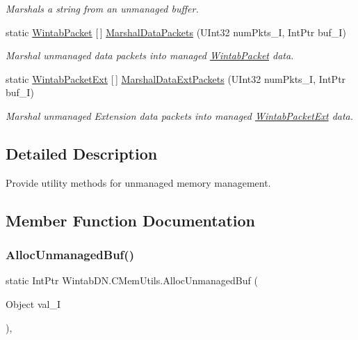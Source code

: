 \begin{DoxyCompactItemize}
\begin{DoxyCompactList}\small\item\em Marshals a string from an unmanaged buffer. \end{DoxyCompactList}\item 
static \mbox{\hyperlink{struct_wintab_d_n_1_1_wintab_packet}{Wintab\+Packet}} \mbox{[}$\,$\mbox{]} \mbox{\hyperlink{class_wintab_d_n_1_1_c_mem_utils_aca1dfda3c26d87d8ab83fa2a2c880c6a}{Marshal\+Data\+Packets}} (U\+Int32 num\+Pkts\+\_\+I, Int\+Ptr buf\+\_\+I)
\begin{DoxyCompactList}\small\item\em Marshal unmanaged data packets into managed \mbox{\hyperlink{struct_wintab_d_n_1_1_wintab_packet}{Wintab\+Packet}} data. \end{DoxyCompactList}\item 
static \mbox{\hyperlink{struct_wintab_d_n_1_1_wintab_packet_ext}{Wintab\+Packet\+Ext}} \mbox{[}$\,$\mbox{]} \mbox{\hyperlink{class_wintab_d_n_1_1_c_mem_utils_a62d347b8878e39416a10a9858ebef9d4}{Marshal\+Data\+Ext\+Packets}} (U\+Int32 num\+Pkts\+\_\+I, Int\+Ptr buf\+\_\+I)
\begin{DoxyCompactList}\small\item\em Marshal unmanaged Extension data packets into managed \mbox{\hyperlink{struct_wintab_d_n_1_1_wintab_packet_ext}{Wintab\+Packet\+Ext}} data. \end{DoxyCompactList}\end{DoxyCompactItemize}


\subsection{Detailed Description}
Provide utility methods for unmanaged memory management. 



\subsection{Member Function Documentation}
\mbox{\label{class_wintab_d_n_1_1_c_mem_utils_aa4382dd752e905681edcada831541acf}} 
\subsubsection{\texorpdfstring{Alloc\+Unmanaged\+Buf()}{AllocUnmanagedBuf()}\hspace{0.1cm}{\footnotesize\ttfamily [1/2]}}
{\footnotesize\ttfamily static Int\+Ptr Wintab\+D\+N.\+C\+Mem\+Utils.\+Alloc\+Unmanaged\+Buf (\begin{DoxyParamCaption}\item[{Object}]{val\+\_\+I }\end{DoxyParamCaption})\hspace{0.3cm}{\ttfamily [inline]}, {\ttfamily [static]}}



